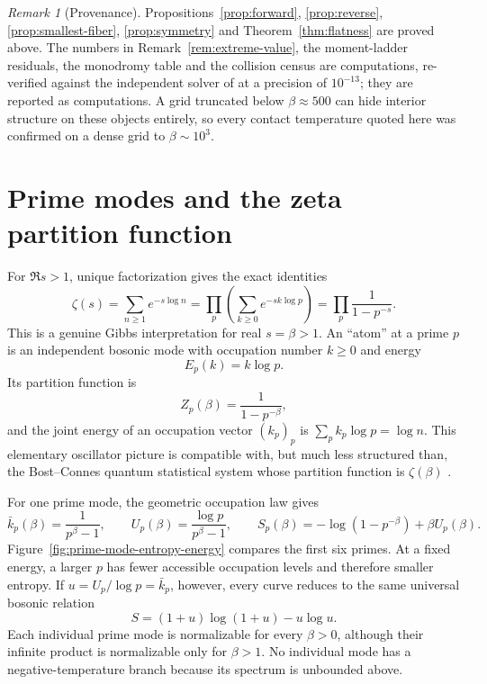 \documentclass[11pt]{article}
\theoremstyle{definition}
\theoremstyle{plain}
\theoremstyle{remark}
\newtheorem{remark}[definition]{Remark}
\begin{document}
\begin{remark}[Provenance]
Propositions~\ref{prop:forward}, \ref{prop:reverse}, \ref{prop:smallest-fiber},
\ref{prop:symmetry} and Theorem~\ref{thm:flatness} are proved above.  The
numbers in Remark~\ref{rem:extreme-value}, the moment-ladder residuals, the
monodromy table and the collision census are computations, re-verified against
the independent solver of \cite{vorozhtsov-exchange} at a precision of
\(10^{-13}\); they are reported as computations.  A grid truncated below
\(\beta\approx500\) can hide interior structure on these objects entirely, so
every contact temperature quoted here was confirmed on a dense grid to
\(\beta\sim10^3\).
\end{remark}

\section{Prime modes and the zeta partition function}
\label{sec:zeta-gibbs}

For \(\Re s>1\), unique factorization gives the exact identities
\begin{equation}
  \zeta(s)
  =\sum_{n\ge1}e^{-s\log n}
  =\prod_p\left(\sum_{k\ge0}e^{-s k\log p}\right)
  =\prod_p\frac1{1-p^{-s}}.
  \label{eq:zeta-partition}
\end{equation}
This is a genuine Gibbs interpretation for real \(s=\beta>1\).  An
``atom'' at a prime \(p\) is an independent bosonic mode with occupation
number \(k\ge0\) and energy
\[
  E_p(k)=k\log p.
\]
Its partition function is
\[
  Z_p(\beta)=\frac1{1-p^{-\beta}},
\]
and the joint energy of an occupation vector \((k_p)_p\) is
\(\sum_pk_p\log p=\log n\).  This elementary oscillator picture is compatible
with, but much less structured than, the Bost--Connes quantum statistical
system whose partition function is \(\zeta(\beta)\)
\cite{bost-connes}.

For one prime mode, the geometric occupation law gives
\[
  \bar k_p(\beta)=\frac1{p^\beta-1},
  \qquad
  U_p(\beta)=\frac{\log p}{p^\beta-1},
  \qquad
  S_p(\beta)=-\log(1-p^{-\beta})+\beta U_p(\beta).
\]
Figure~\ref{fig:prime-mode-entropy-energy} compares the first six primes.
At a fixed energy, a larger \(p\) has fewer accessible occupation levels and
therefore smaller entropy.  If \(u=U_p/\log p=\bar k_p\), however, every curve
reduces to the same universal bosonic relation
\[
  S=(1+u)\log(1+u)-u\log u.
\]
Each individual prime mode is normalizable for every \(\beta>0\), although
their infinite product is normalizable only for \(\beta>1\).  No individual
mode has a negative-temperature branch because its spectrum is unbounded
above.
\end{document}
